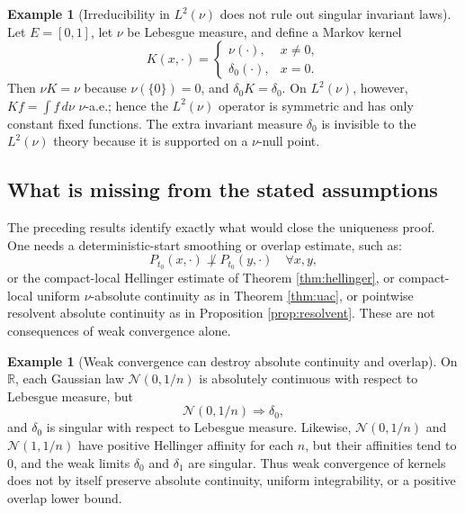 \documentclass[12pt]{article}
\newcommand{\R}{\mathbb R}
\newcommand{\1}{\mathbf 1}
\newcommand{\dd}{\,d}
\theoremstyle{plain}
\theoremstyle{definition}
\newtheorem{example}[theorem]{Example}
\theoremstyle{remark}
\numberwithin{equation}{section}
\begin{document}
\begin{example}[Irreducibility in \(L^2(\nu)\) does not rule out singular invariant laws]\label{ex:nullmod}
Let \(E=[0,1]\), let \(\nu\) be Lebesgue measure, and define a Markov kernel
\[
K(x,\cdot)=
\begin{cases}
\nu(\cdot),&x\ne0,\\
\delta_0(\cdot),&x=0.
\end{cases}
\]
Then \(\nu K=\nu\) because \(\nu(\{0\})=0\), and \(\delta_0K=\delta_0\).  On
\(L^2(\nu)\), however, \(Kf=\int f\dd\nu\) \(\nu\)-a.e.; hence the \(L^2(\nu)\)
operator is symmetric and has only constant fixed functions.  The extra
invariant measure \(\delta_0\) is invisible to the \(L^2(\nu)\) theory because
it is supported on a \(\nu\)-null point.
\end{example}

\subsection{What is missing from the stated assumptions}

The preceding results identify exactly what would close the uniqueness proof.
One needs a deterministic-start smoothing or overlap estimate, such as:
\[
P_{t_0}(x,\cdot)\not\perp P_{t_0}(y,\cdot)\quad\forall x,y,
\]
or the compact-local Hellinger estimate of Theorem \ref{thm:hellinger}, or
compact-local uniform \(\nu\)-absolute continuity as in Theorem
\ref{thm:uac}, or pointwise resolvent absolute continuity as in Proposition
\ref{prop:resolvent}.  These are not consequences of weak convergence alone.

\begin{example}[Weak convergence can destroy absolute continuity and overlap]
On \(\R\), each Gaussian law \(\mathcal N(0,1/n)\) is absolutely continuous with
respect to Lebesgue measure, but
\[
\mathcal N(0,1/n)\Rightarrow\delta_0,
\]
and \(\delta_0\) is singular with respect to Lebesgue measure.  Likewise,
\(\mathcal N(0,1/n)\) and \(\mathcal N(1,1/n)\) have positive Hellinger affinity
for each \(n\), but their affinities tend to \(0\), and the weak limits
\(\delta_0\) and \(\delta_1\) are singular.  Thus weak convergence of kernels
does not by itself preserve absolute continuity, uniform integrability, or a
positive overlap lower bound.
\end{example}
\end{document}
